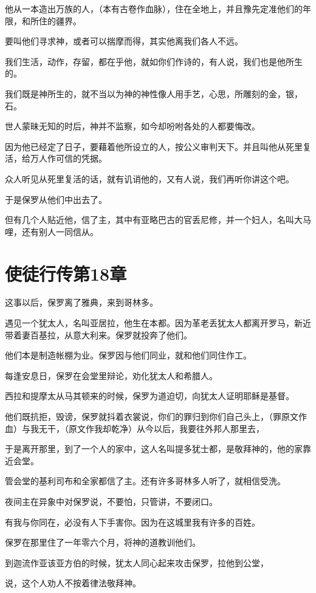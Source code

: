 \documentclass[12pt,oneside]{book}
\begin{document}
他从一本造出万族的人，（本有古卷作血脉），住在全地上，并且豫先定准他们的年限，和所住的疆界。

要叫他们寻求神，或者可以揣摩而得，其实他离我们各人不远。

我们生活，动作，存留，都在乎他，就如你们作诗的，有人说，我们也是他所生的。

我们既是神所生的，就不当以为神的神性像人用手艺，心思，所雕刻的金，银，石。

世人蒙昧无知的时后，神并不监察，如今却吩咐各处的人都要悔改。

因为他已经定了日子，要藉着他所设立的人，按公义审判天下。并且叫他从死里复活，给万人作可信的凭据。

众人听见从死里复活的话，就有讥诮他的，又有人说，我们再听你讲这个吧。

于是保罗从他们中出去了。

但有几个人贴近他，信了主，其中有亚略巴古的官丢尼修，并一个妇人，名叫大马哩，还有别人一同信从。

\chapter{使徒行传第18章}
这事以后，保罗离了雅典，来到哥林多。

遇见一个犹太人，名叫亚居拉，他生在本都。因为革老丢犹太人都离开罗马，新近带着妻百基拉，从意大利来。保罗就投奔了他们。

他们本是制造帐棚为业。保罗因与他们同业，就和他们同住作工。

每逢安息日，保罗在会堂里辩论，劝化犹太人和希腊人。

西拉和提摩太从马其顿来的时候，保罗为道迫切，向犹太人证明耶稣是基督。

他们既抗拒，毁谤，保罗就抖着衣裳说，你们的罪归到你们自己头上，（罪原文作血）与我无干，（原文作我却乾净）从今以后，我要往外邦人那里去，

于是离开那里，到了一个人的家中，这人名叫提多犹士都，是敬拜神的，他的家靠近会堂。

管会堂的基利司布和全家都信了主。还有许多哥林多人听了，就相信受洗。

夜间主在异象中对保罗说，不要怕，只管讲，不要闭口。

有我与你同在，必没有人下手害你。因为在这城里我有许多的百姓。

保罗在那里住了一年零六个月，将神的道教训他们。

到迦流作亚该亚方伯的时候，犹太人同心起来攻击保罗，拉他到公堂，

说，这个人劝人不按着律法敬拜神。
\end{document}
